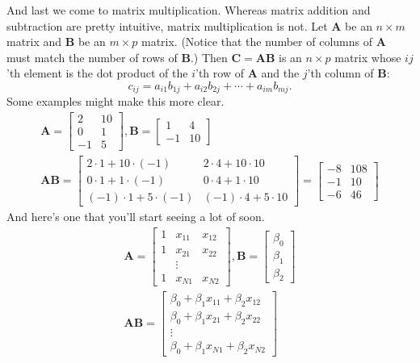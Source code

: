 \documentclass[
  12pt,
  oneside,openany]{book}
\begin{document}
And last we come to matrix multiplication. Whereas matrix addition and subtraction are pretty intuitive, matrix multiplication is not. Let \(\mathbf{A}\) be an \(n \times m\) matrix and \(\mathbf{B}\) be an \(m \times p\) matrix. (Notice that the number of columns of \(\mathbf{A}\) must match the number of rows of \(\mathbf{B}\).) Then \(\mathbf{C} = \mathbf{A} \mathbf{B}\) is an \(n \times p\) matrix whose \(ij\)'th element is the dot product of the \(i\)'th row of \(\mathbf{A}\) and the \(j\)'th column of \(\mathbf{B}\):
\[
c_{ij} = a_{i1} b_{1j} + a_{i2} b_{2j} + \cdots + a_{im} b_{mj}.
\]
Some examples might make this more clear.
\[
\begin{gathered}
\mathbf{A} = \begin{bmatrix}
  2 & 10 \\
  0 & 1 \\
  -1 & 5
\end{bmatrix},
\mathbf{B} = \begin{bmatrix}
  1 & 4 \\
  -1 & 10
\end{bmatrix} \\
\mathbf{A} \mathbf{B} = \begin{bmatrix}
  2 \cdot 1 + 10 \cdot (-1) & 2 \cdot 4 + 10 \cdot 10 \\
  0 \cdot 1 + 1 \cdot (-1) & 0 \cdot 4 + 1 \cdot 10 \\
  (-1) \cdot 1 + 5 \cdot (-1) & (-1) \cdot 4 + 5 \cdot 10
\end{bmatrix}
= \begin{bmatrix}
  -8 & 108 \\
  -1 & 10 \\
  -6 & 46
\end{bmatrix}
\end{gathered}
\]
And here's one that you'll start seeing a lot of soon.
\[
\begin{gathered}
\mathbf{A} = \begin{bmatrix}
  1 & x_{11} & x_{12} \\
  1 & x_{21} & x_{22} \\
  & \vdots \\
  1 & x_{N1} & x_{N2}
\end{bmatrix},
\mathbf{B} = \begin{bmatrix}
  \beta_0 \\
  \beta_1 \\
  \beta_2
\end{bmatrix} \\
\mathbf{A} \mathbf{B} = \begin{bmatrix}
  \beta_0 + \beta_1 x_{11} + \beta_2 x_{12} \\
  \beta_0 + \beta_1 x_{21} + \beta_2 x_{22} \\
  \vdots \\
  \beta_0 + \beta_1 x_{N1} + \beta_2 x_{N2}
\end{bmatrix}
\end{gathered}
\]
\end{document}
